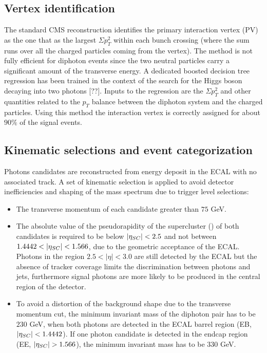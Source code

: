 \subsection{Vertex identification}
The standard CMS reconstruction identifies the primary interaction vertex (PV) as the one 
that as the largest $\Sigma p_T^2$ within each bunch crossing (where the sum runs over all the charged particles
coming from the vertex). The method is not fully efficient for diphoton events since the two neutral
particles carry a significant amount of the transverse energy.
A dedicated boosted decision tree regression has been trained in the context of the search for the
Higgs boson decaying into two photons [??]. Inputs to the regression are the $\Sigma p_T^2$ and
other quantities related to the $p_T$ balance between the diphoton system and the charged particles.
Using this method the interaction vertex is correctly assigned for about $90\%$ of the signal events.

\subsection{Kinematic selections and event categorization}
\label{subsec:event_cats}
Photons candidates are reconstructed from energy deposit in the ECAL with no associated track.
A set of kinematic selection is applied to avoid detector inefficiencies and shaping of the mass
spectrum due to trigger level selections:
\begin{itemize}
\item The transverse momentum of each candidate greater than $75$ GeV.
\item The absolute value of the pseudorapidity of the supercluster (\absScEta) of both
candidates is required to be below $|\eta_{SC}| < 2.5$ and not between $1.4442 < |\eta_{SC}| < 1.566$,
due to the geometric acceptance of the ECAL. Photons in the region $2.5 < |\eta| < 3.0$ are still detected by the ECAL
but the absence of tracker coverage limits the discrimination between photons and jets, furthermore signal photons
are more likely to be produced in the central region of the detector.
\item To avoid a distortion of the background shape due to the transverse momentum
  cut, the minimum invariant mass of the diphoton pair has to be $230$ GeV, when
both photons are detected in the ECAL barrel region (EB, $|\eta_{SC}| < 1.4442$). If one photon candidate
is detected in the endcap region (EE, $|\eta_{SC}| > 1.566$), the minimum invariant mass
has to be $330$ GeV.
\end{itemize}

